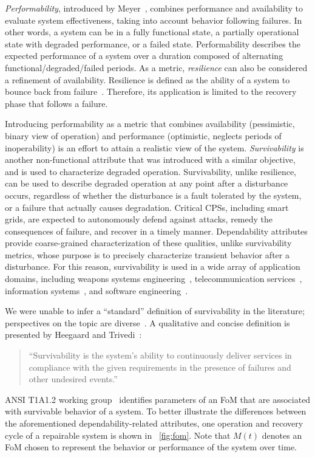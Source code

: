 \documentclass[review]{elsarticle}
\begin{document}
\emph{Performability}, introduced by Meyer~\cite{Me80}, combines performance and availability to evaluate system effectiveness, taking into account behavior following failures. In other words, a system can be in a fully functional state, a partially operational state with degraded performance, or a failed state. Performability describes the expected performance of a system over a duration composed of alternating functional/degraded/failed periods. As a metric, \emph{resilience} can also be considered a refinement of availability. Resilience is defined as the ability of a system to bounce back from failure~\cite{HeR12,HoB16}. Therefore, its application is limited to the recovery phase that follows a failure.

Introducing performability as a metric that combines availability (pessimistic, binary view of operation) and performance (optimistic, neglects periods of inoperability) is an effort to attain a realistic view of the system. \emph{Survivability} is another non-functional attribute that was introduced with a similar objective, and is used to characterize degraded operation. Survivability, unlike resilience, can be used to describe degraded operation at any point after a disturbance occurs, regardless of whether the disturbance is a fault tolerated by the system, or a failure that actually causes degradation. Critical CPSs, including smart grids, are expected to autonomously defend against attacks, remedy the consequences of failure, and recover in a timely manner. Dependability attributes provide coarse-grained characterization of these qualities, unlike survivability metrics, whose purpose is to precisely characterize transient behavior after a disturbance. For this reason, survivability is used in a wide array of application domains, including weapons systems engineering~\cite{Ba03}, telecommunication services~\cite{STD1037}, information systems~\cite{ElF97}, and software engineering~\cite{DeW88}.

We were unable to infer a ``standard'' definition of survivability in the literature; perspectives on the topic are diverse~\cite{AvC15}. A qualitative and concise definition is presented by Heegaard and Trivedi~\cite{HeT09}:
\begin{quote}
``Survivability is the system's ability to continuously deliver services in compliance with the given requirements in the presence of failures and other undesired events.''
\end{quote}

ANSI T1A1.2 working group~\cite{T1A1} identifies parameters of an FoM that are associated with survivable behavior of a system. To better illustrate the differences between the aforementioned dependability-related attributes, one operation and recovery cycle of a repairable system is shown in \figurename~\ref{fig:fom}. Note that $M(t)$ denotes an FoM chosen to represent the behavior or performance of the system over time.
\end{document}
